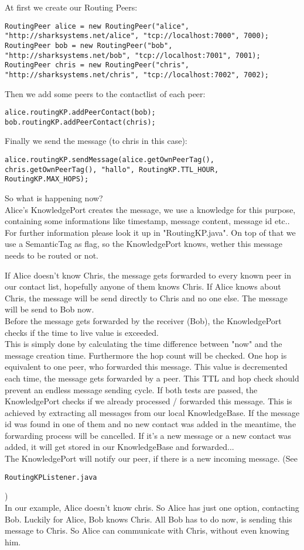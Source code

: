 At first we create our Routing Peers:
\begin{verbatim}
RoutingPeer alice = new RoutingPeer("alice", "http://sharksystems.net/alice", "tcp://localhost:7000", 7000);
RoutingPeer bob = new RoutingPeer("bob", "http://sharksystems.net/bob", "tcp://localhost:7001", 7001);
RoutingPeer chris = new RoutingPeer("chris", "http://sharksystems.net/chris", "tcp://localhost:7002", 7002);
\end{verbatim}

Then we add some peers to the contactlist of each peer:

\begin{verbatim}
alice.routingKP.addPeerContact(bob);
bob.routingKP.addPeerContact(chris);
\end{verbatim}
Finally we send the message (to chris in this case):
\begin{verbatim}
alice.routingKP.sendMessage(alice.getOwnPeerTag(), chris.getOwnPeerTag(), "hallo", RoutingKP.TTL_HOUR, RoutingKP.MAX_HOPS);
\end{verbatim}

So what is happening now?\\
Alice's KnowledgePort creates the message, we use a knowledge for this purpose, containing some informations like timestamp,
message content, message id etc.. For further information please look it up in "RoutingKP.java". On top of that we use a SemanticTag as flag, so the KnowledgePort knows, wether this message needs to be routed or not.

If Alice doesn't know Chris, the message gets forwarded to every known peer in our contact list, hopefully anyone of them knows Chris. If Alice knows about Chris, the message will be send directly to Chris and no one else. The message will be send to Bob now.\\

Before the message gets forwarded by the receiver (Bob), the KnowledgePort checks if the time to live value is exceeded.\\
This is simply done by calculating the time difference between "now" and the message creation time. Furthermore the hop count
will be checked. One hop is equivalent to one peer, who forwarded this message. This value is decremented each time, the message
gets forwarded by a peer. This TTL and hop check should prevent an endless message sending cycle. If both tests are passed, 
the KnowledgePort checks if we already processed / forwarded this message. This is achieved by extracting all messages from our
local KnowledgeBase. If the message id was found in one of them and no new contact was added in the meantime, the forwarding process will be cancelled. If it's a new message or a new contact was added, it will get stored in our KnowledgeBase and forwarded... \\
The KnowledgePort will notify our peer, if there is a new incoming message. (See \begin{verbatim}RoutingKPListener.java \end{verbatim} )\\

In our example, Alice doesn't know chris. So Alice has just one option, contacting Bob. Luckily for Alice, Bob knows Chris.
All Bob has to do now, is sending this message to Chris. So Alice can communicate with Chris, without even knowing him.

